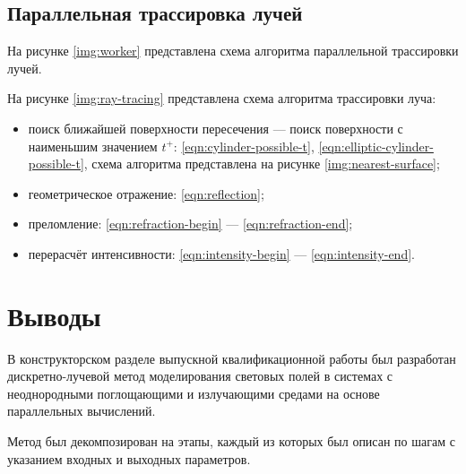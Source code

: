 \subsection{Параллельная трассировка лучей}

На рисунке \ref{img:worker} представлена схема алгоритма параллельной трассировки лучей.


На рисунке \ref{img:ray-tracing} представлена схема алгоритма трассировки луча:
\begin{itemize}
	\item поиск ближайшей поверхности пересечения — поиск поверхности с наименьшим значением $t^+$: \eqref{eqn:cylinder-possible-t}, \eqref{eqn:elliptic-cylinder-possible-t}, схема алгоритма представлена на рисунке \ref{img:nearest-surface};
	\item геометрическое отражение: \eqref{eqn:reflection};
	\item преломление: \eqref{eqn:refraction-begin} — \eqref{eqn:refraction-end};
	\item перерасчёт интенсивности: \eqref{eqn:intensity-begin} — \eqref{eqn:intensity-end}.
\end{itemize}



\section*{Выводы}

В конструкторском разделе выпускной квалификационной работы был разработан дискретно-лучевой метод моделирования световых полей в системах с неоднородными поглощающими и излучающими средами на основе параллельных вычислений.

Метод был декомпозирован на этапы, каждый из которых был описан по шагам с указанием входных и выходных параметров.

